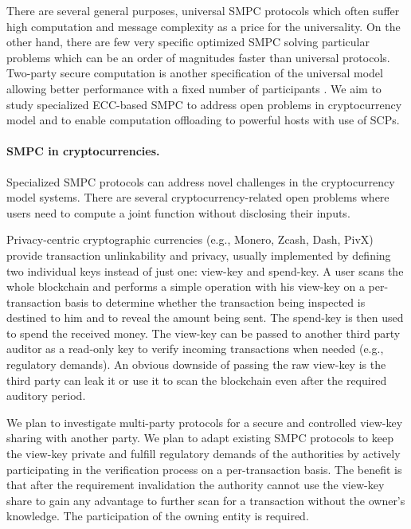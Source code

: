 \documentclass[
  digital, %
  twoside, %
  table,   %
  lof,     %
  lot,     %
]{fithesis3}
\newcounter{ph4_show_guides}
\theoremstyle{definition}
\theoremstyle{remark}
\begin{document}
\begin{ecmmnt}
There are several general purposes, universal SMPC protocols which often suffer high computation and message complexity as a price for the universality. On the other hand, there are few very specific optimized SMPC solving particular problems which can be an order of magnitudes faster than universal protocols. Two-party secure computation is another specification of the universal model allowing better performance with a fixed number of participants \cite{Wang:2017:AGE:3133956.3134053}. We aim to study specialized ECC-based SMPC to address open problems in cryptocurrency model and to enable computation offloading to powerful hosts with use of SCPs.

\paragraph{SMPC in cryptocurrencies.} 
Specialized SMPC protocols can address novel challenges in the cryptocurrency model systems. There are several cryptocurrency-related open problems where users need to compute a joint function without disclosing their inputs.

Privacy-centric cryptographic currencies (e.g., Monero, Zcash, Dash, PivX\cite{monero_1098}) provide transaction unlinkability and privacy, usually implemented by defining two individual keys instead of just one: view-key and spend-key. A user scans the whole blockchain and performs a simple operation with his view-key on a per-transaction basis to determine whether the transaction being inspected is destined to him and to reveal the amount being sent. The spend-key is then used to spend the received money.
The view-key can be passed to another third party auditor as a read-only key to verify incoming transactions when needed (e.g., regulatory demands). An obvious downside of passing the raw view-key is the third party can leak it or use it to scan the blockchain even after the required auditory period. 
 
We plan to investigate multi-party protocols for a secure and controlled view-key sharing with another party. We plan to adapt existing SMPC protocols to keep the view-key private and fulfill regulatory demands of the authorities by actively participating in the verification process on a per-transaction basis. The benefit is that after the requirement invalidation the authority cannot use the view-key share to gain any advantage to further scan for a transaction without the owner's knowledge. The participation of the owning entity is required.


\end{ecmmnt}
\end{document}
